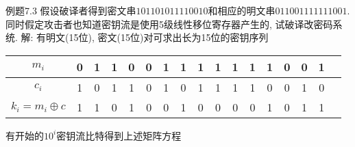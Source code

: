 \documentclass[UTF8]{ctexart}
\begin{document}
  例题7.3 假设破译者得到密文串$101101011110010$和相应的明文串$011001111111001$. 同时假定攻击者也知道密钥流是使用5级线性移位寄存器产生的, 试破译改密码系统.
  解: 有明文(15位), 密文(15位)对可求出长为15位的密钥序列
  \begin{table}
    \centering
    \begin{tabular}{|c|c|c|c|c|c|c|c|c|c|c|c|c|c|c|c|c|}
      \hline
      $m_i$ &0 &1 &1 &0 &0 &1 &1 &1 &1 &1 &1 &1 &0 &0 &1\\
      \hline
      $c_i$ &1 &0 &1 &1 &0 &1 &0 &1 &1 &1 &1 &0 &0 &1 &0\\
      \hline
      $k_i=m_i\oplus c$ &1 &1 &0 &1 &0 &0 &1 &0 &0 &0 &0 &1 &0 &1 &1\\
      \hline
    \end{tabular}
  \end{table}

  有开始的$10^i$密钥流比特得到上述矩阵方程
\end{document}
